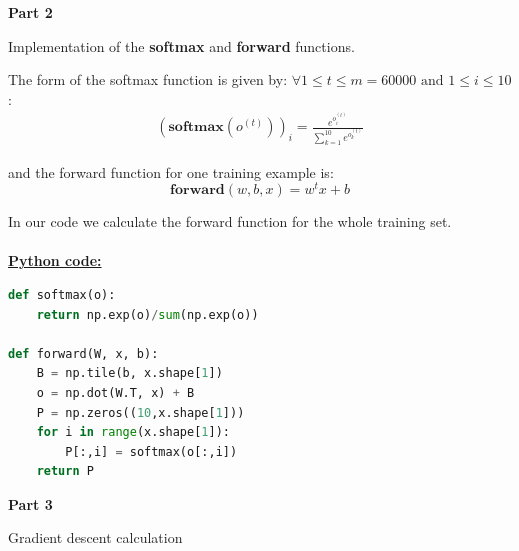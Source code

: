 \documentclass{article}
\begin{document}
\pagebreak
\begin{center}
\textbf{Part 2 }
\end{center}
\begin{biomathg}
Implementation of the  \textbf{softmax} and \textbf{forward}   functions.
\end{biomathg}

\vspace{1cm}



\noindent The form of the softmax function is given by:
$ \forall  1 \leq t  \leq m = 60000 \text{ and } 1 \leq i  \leq 10$ :
\begin{align*}
(\textbf{softmax}(o^{(t)}))_i = \frac{e^{o^{(t)}_{i}}}{\sum_{k=1}^{10}e^{o^{(t)}_{k}}}
\end{align*}

\noindent and the forward function for one training example is:
$$\textbf{forward}(w,b,x) = w^{t}x +b $$

\noindent In our code we calculate the forward function for the whole training set.
\\ \\
\noindent \underline{\textbf{Python code:}} \\
\begin{biomathy}
\begin{lstlisting}[language=python]
def softmax(o):
    return np.exp(o)/sum(np.exp(o))

def forward(W, x, b):
    B = np.tile(b, x.shape[1])
    o = np.dot(W.T, x) + B
    P = np.zeros((10,x.shape[1]))
    for i in range(x.shape[1]):
        P[:,i] = softmax(o[:,i])
    return P
\end{lstlisting}
\end{biomathy}

\pagebreak
\begin{center}
\textbf{Part 3 }
\end{center}


\begin{biomathg}
 Gradient descent calculation
\end{biomathg}

\vspace{0.3cm}
\end{document}
